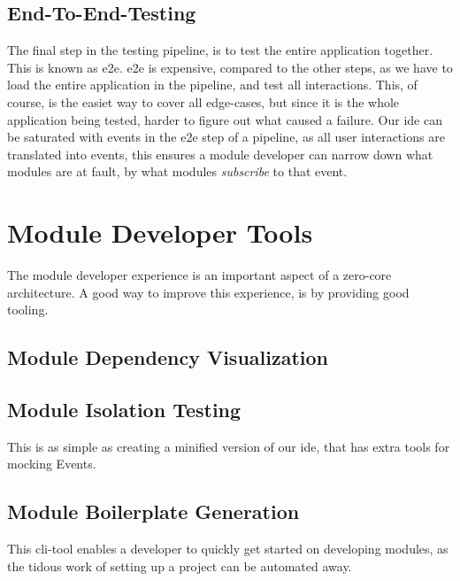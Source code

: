 \subsection{End-To-End-Testing}

The final step in the testing pipeline, is to test the entire application
together. This is known as \gls{e2e}. \gls{e2e} is expensive, compared to the
other steps, as we have to load the entire application in the pipeline, and test
all interactions. This, of course, is the easiet way to cover all edge-cases, but
since it is the whole application being tested, harder to figure out what caused
a failure. Our \gls{ide} can be saturated with events in the \gls{e2e} step of a
pipeline, as all user interactions are translated into events, this ensures a
module developer can narrow down what modules are at fault, by what modules
\textit{subscribe} to that event.

\section{Module Developer Tools}

The module developer experience is an important aspect of a zero-core
architecture. A good way to improve this experience, is by providing good
tooling.

\subsection{Module Dependency Visualization}


\subsection{Module Isolation Testing}


This is as simple as creating a minified version of our \gls{ide}, that has
extra tools for mocking Events.

\subsection{Module Boilerplate Generation}


This \gls{cli}-tool enables a developer to quickly get started on developing
modules, as the tidous work of setting up a project can be automated away.

